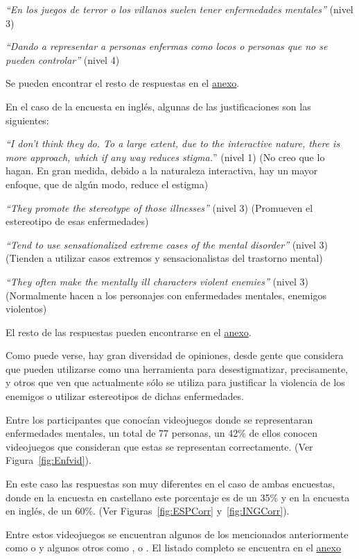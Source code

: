 \documentclass[12pt, a4paper,twoside,titlepage]{book}
\begin{document}
\textit{``En los juegos de terror o los villanos suelen tener enfermedades mentales''} (nivel 3)

\textit{``Dando a representar a personas enfermas como locos o personas que no se pueden controlar''} (nivel 4) 

Se pueden encontrar el resto de respuestas en el \hyperref[estigmaCastellano]{anexo}.

En el caso de la encuesta en inglés, algunas de las justificaciones son las siguientes:

\textit{``I don't think they do. To a large extent, due to the interactive nature, there is more approach, which if any way reduces stigma.}'' (nivel 1) (No creo que lo hagan. En gran medida, debido a la naturaleza interactiva, hay un mayor enfoque, que de algún modo, reduce el estigma)  

\textit{``They promote the stereotype of those illnesses''} (nivel 3) (Promueven el estereotipo de esas enfermedades)

\textit{``Tend to use sensationalized extreme cases of the mental disorder''} (nivel 3) (Tienden a utilizar casos extremos y sensacionalistas del trastorno mental)

\textit{``They often make the mentally ill characters violent enemies''} (nivel 3) (Normalmente hacen a los personajes con enfermedades mentales, enemigos violentos)

El resto de las respuestas pueden encontrarse en el \hyperref[estigmaIngles]{anexo}.

Como puede verse, hay gran diversidad de opiniones, desde gente que considera que pueden utilizarse como una herramienta para desestigmatizar, precisamente, y otros que ven que actualmente sólo se utiliza para justificar la violencia de los enemigos o utilizar estereotipos de dichas enfermedades. 

Entre los participantes que conocían videojuegos donde se representaran enfermedades mentales, un total de 77 personas, un 42\% de ellos conocen videojuegos que consideran que estas se representan correctamente. (Ver Figura~\ref{fig:Enfvid}). 

En este caso las respuestas son muy diferentes en el caso de ambas encuestas, donde en la encuesta en castellano este porcentaje es de un 35\% y en la encuesta en inglés, de un 60\%. (Ver Figuras~\ref{fig:ESPCorr} y~\ref{fig:INGCorr}). 

 Entre estos videojuegos se encuentran algunos de los mencionados anteriormente como  o  y algunos otros como ,  o . El listado completo se encuentra en el \hyperref[listadoVidCorr]{anexo}\\ 
 
\end{document}
